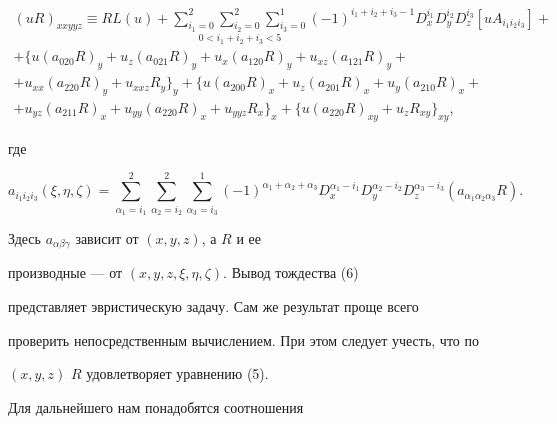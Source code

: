 \begin{multline} 


(u R)_{xxyyz}\equiv R L(u)+ 


\underset{0<i_1+i_2+i_3<5} 


{\sum^2_{i_1=0}\sum^2_{i_2=0}\sum^1_{i_3=0}}{}


(-1)^{i_1+i_2+i_3-1}D^{i_1}_x D^{i_2}_y D^{i_3}_z 


[u A_{i_1i_2i_3}]+ \\ 


% 


+\{u(a_{020}R)_y+u_z(a_{021}R)_y+u_x(a_{120}R)_y+ 


u_{x z}(a_{121}R)_y + \\ 


% 


+u_{xx}(a_{220}R)_y+u_{xxz}R_y\}_y+ 


\{u(a_{200}R)_x+u_z(a_{201}R)_x+u_y(a_{210}R)_x +\\ 


% 


+u_{yz}(a_{211}R)_x+u_{yy}(a_{220}R)_x+ 


u_{yyz}R_x\}_x+ 


\{u(a_{220}R)_{xy}+u_z R_{xy}\}_{xy}, 


\end{multline} 


где 


$$ 


a_{i_1i_2i_3}(\xi,\eta,\zeta)=\sum^2_{\alpha_1=i_1} 


\sum^2_{\alpha_2=i_2}\sum^1_{\alpha_3=i_3} 


(-1)^{\alpha_1+\alpha_2+\alpha_3} 


D^{\alpha_1-i_1}_x D^{\alpha_2-i_2}_y 


D^{\alpha_3-i_3}_z(a_{\alpha_1\alpha_2\alpha_3}R). 


$$ 


Здесь $a_{\alpha\beta\gamma}$ зависит от $(x,y,z)$, а $R$ и ее 


производные --- от $(x,y,z,\xi,\eta,\zeta)$. Вывод тождества (6) 


представляет эвристическую задачу. Сам же результат проще всего 


проверить непосредственным вычислением. При этом следует учесть, что по 


$(x,y,z)$\; $R$ удовлетворяет уравнению (5). 


 


Для дальнейшего нам понадобятся соотношения 


